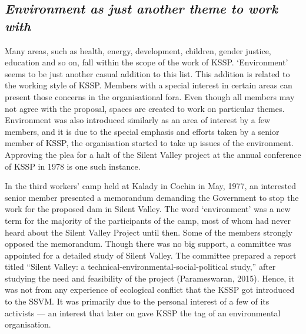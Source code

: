 \documentclass[twoside, 13pt]{article}
\begin{document}
{{{\vspace{-.2cm}

{\fontsize{8}{10}\selectfont\subsection*{\textit{Environment as just another theme to work with}}}

{\fontsize{12}{14}\selectfont Many areas, such as health, energy, development, children, gender justice, education and so on, fall within the scope of the work of KSSP. ‘Environment’ seems to be just another casual addition to this list. This addition is related to the working style of KSSP. Members with a special interest in certain areas can present those concerns in the organisational fora. Even though all members may not agree with the proposal, spaces are created to work on particular themes. Environment was also introduced similarly as an area of interest by a few members, and it is due to the special emphasis and efforts taken by a senior member of KSSP, the organisation started to take up issues of the environment. Approving the plea for a halt of the Silent Valley project at the annual conference of KSSP in 1978 is one such instance.

In the third workers’ camp held at Kalady in Cochin in May, 1977, an interested senior member presented a memorandum demanding the Government to stop the work for the proposed dam in Silent Valley. The word ‘environment’ was a new term for the majority of the participants of the camp, most of whom had never heard about the Silent Valley Project until then. Some of the members strongly opposed the memorandum. Though there was no big support, a committee was appointed for a detailed study of Silent Valley. The committee prepared a report titled “Silent Valley: a technical-environmental-social-political study,” after studying the need and feasibility of the project (Parameswaran, 2015). Hence, it was not from any experience of ecological conflict that the KSSP got introduced to the SSVM. It was primarily due to the personal interest of a few of its activists — an interest that later on gave KSSP the tag of an environmental organisation.}

\vspace{-.5cm}

}}}
\end{document}
